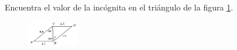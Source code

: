 \question[10]  Encuentra el valor de la incógnita en el triángulo de la figura \ref{fig:angle_triangle_10}.
\begin{figure}[H]
    \begin{center}
        \includegraphics[width=0.2\textwidth]{../images/angle_triangle_10.png}
    \end{center}
    \caption{}
    \label{fig:angle_triangle_10}
\end{figure}